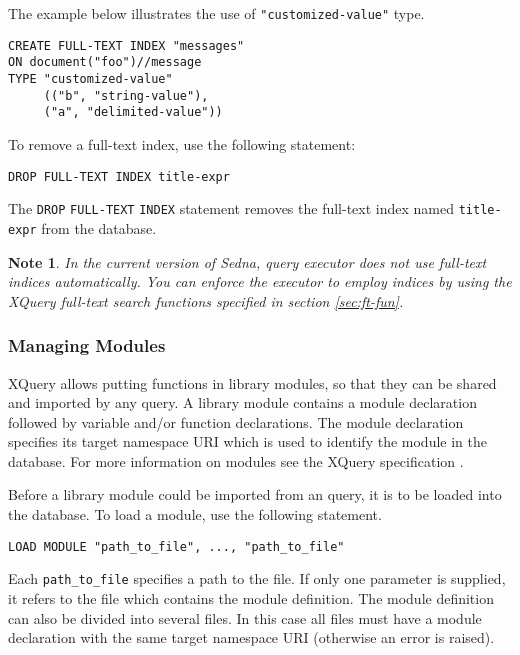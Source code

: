 \documentclass[a4paper,12pt]{article}
\newtheorem{note}{Note}    %
\begin{document}
The example below illustrates the use of \verb!"customized-value"! type.
\begin{verbatim}
CREATE FULL-TEXT INDEX "messages"
ON document("foo")//message
TYPE "customized-value" 
     (("b", "string-value"),
     ("a", "delimited-value"))
\end{verbatim}

To remove a full-text index, use the following statement:
\begin{verbatim}
DROP FULL-TEXT INDEX title-expr
\end{verbatim}

The \verb!DROP! \verb!FULL-TEXT! \verb!INDEX! statement removes the full-text
index named \verb!title-expr! from the database.

\begin{note}
In the current version of Sedna, query executor does not use full-text indices
automatically. You can enforce the executor to employ indices by using the
XQuery full-text search functions specified in section \ref{sec:ft-fun}.
\end{note}


\subsubsection{Managing Modules}
XQuery allows putting functions in library modules, so that they can be shared
and imported by any query. A library module contains a module declaration
followed by variable and/or function declarations. The module declaration
specifies its target namespace URI which is used to identify the module in the
database. For more information on modules see the XQuery specification
\cite{paper:query-language}.

Before a library module could be imported from an query, it is to be loaded into
the database. To load a module, use the following statement.

\begin{verbatim}
LOAD MODULE "path_to_file", ..., "path_to_file"
\end{verbatim}

Each \verb!path_to_file! specifies a path to the file. If only one parameter is
supplied, it refers to the file which contains the module definition. The module
definition can also be divided into several files. In this case all files must
have a module declaration with the same target namespace URI (otherwise an error
is raised).
\end{document}
